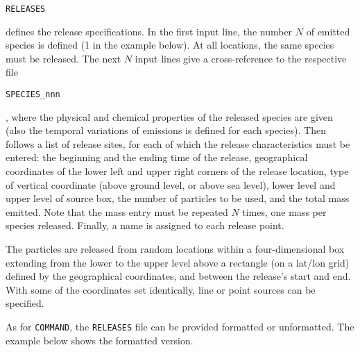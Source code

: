 \documentclass{egu}                  %
\begin{document}
\begin{footnotesize}\verb|RELEASES|\end{footnotesize} defines the release
specifications.  In the first input line, the number $N$ of emitted species is
defined (1 in the example below).  At all locations, the same species must be
released.  The next $N$ input lines give a cross-reference to the respective file
\begin{footnotesize}\verb|SPECIES_nnn|\end{footnotesize}, where the physical and
chemical properties of the released species are given (also the temporal
variations of emissions is defined for each species).  Then follows a list of
release sites, for each of which the release characteristics must be entered:
the beginning and the ending time of the release, geographical coordinates of
the lower left and upper right corners of the release location, type of
vertical coordinate (above ground level, or above sea level), lower level and
upper level of source box, the number of particles to be used, and the total
mass emitted.  Note that the mass entry must be repeated $N$ times, one mass
per species released.  Finally, a name is assigned to each release point.\par

The particles are released from random locations within a four-dimensional box
extending from the lower to the upper level above a rectangle (on a lat/lon
grid) defined by the geographical coordinates, and between the release's start
and end.  With some of the coordinates set identically, line or point sources
can be specified.

As for \verb|COMMAND|, the \verb|RELEASES| file can be provided formatted or
unformatted.  The example below shows the formatted version.
\end{document}
